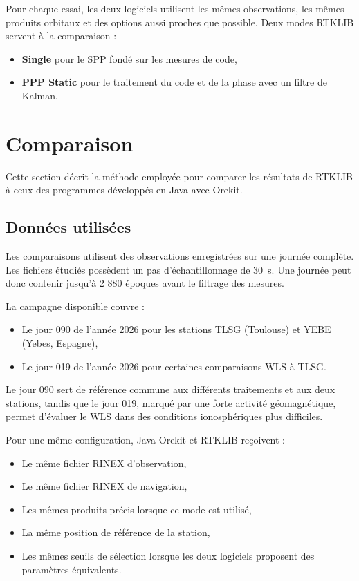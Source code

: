 Pour chaque essai, les deux logiciels utilisent les mêmes observations, les
mêmes produits orbitaux et des options aussi proches que possible. Deux modes
RTKLIB servent à la comparaison :

\begin{itemize}
    \item \textbf{Single} pour le SPP fondé sur les mesures de code,
    \item \textbf{PPP Static} pour le traitement du code et de la phase avec
    un filtre de Kalman.
\end{itemize}

\section{Comparaison}
\label{sec:validation_protocol}

Cette section décrit la méthode employée pour comparer les résultats de RTKLIB
à ceux des programmes développés en Java avec Orekit.

\subsection{Données utilisées}
\label{sec:validation_data}

Les comparaisons utilisent des observations enregistrées sur une journée complète.
Les fichiers étudiés possèdent un pas d'échantillonnage de 30~s. Une journée
peut donc contenir jusqu'à 2 880 époques avant le filtrage des mesures.

La campagne disponible couvre :

\begin{itemize}
    \item Le jour 090 de l'année 2026 pour les stations TLSG (Toulouse) et YEBE (Yebes, Espagne),
    \item Le jour 019 de l'année 2026 pour certaines comparaisons WLS à TLSG.
\end{itemize}

Le jour 090 sert de référence commune aux différents traitements et aux deux
stations, tandis que le jour 019, marqué par une forte activité géomagnétique,
permet d'évaluer le WLS dans des conditions
ionosphériques plus difficiles.

Pour une même configuration, Java-Orekit et RTKLIB reçoivent :

\begin{itemize}
    \item Le même fichier RINEX d'observation,
    \item Le même fichier RINEX de navigation,
    \item Les mêmes produits précis lorsque ce mode est utilisé,
    \item La même position de référence de la station,
    \item Les mêmes seuils de sélection lorsque les deux logiciels proposent
    des paramètres équivalents.
\end{itemize}



